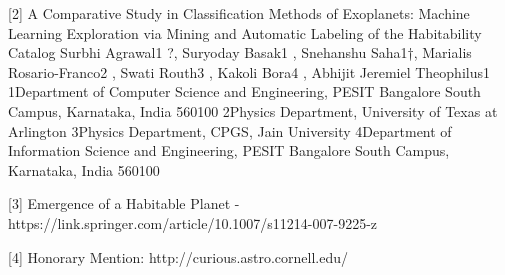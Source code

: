 \documentclass[11pt]{article}
\begin{document}
{[}2{]} A Comparative Study in Classification Methods of Exoplanets:
Machine Learning Exploration via Mining and Automatic Labeling of the
Habitability Catalog Surbhi Agrawal1 ?, Suryoday Basak1 , Snehanshu
Saha1†, Marialis Rosario-Franco2 , Swati Routh3 , Kakoli Bora4 , Abhijit
Jeremiel Theophilus1 1Department of Computer Science and Engineering,
PESIT Bangalore South Campus, Karnataka, India 560100 2Physics
Department, University of Texas at Arlington 3Physics Department, CPGS,
Jain University 4Department of Information Science and Engineering,
PESIT Bangalore South Campus, Karnataka, India 560100

{[}3{]} Emergence of a Habitable Planet -
https://link.springer.com/article/10.1007/s11214-007-9225-z

{[}4{]} Honorary Mention: http://curious.astro.cornell.edu/


    
    
    
    
\end{document}
